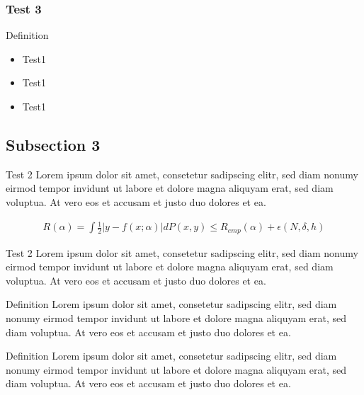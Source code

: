 \documentclass{beamer}
\begin{document}
        \begin{frame}
            \frametitle{Test 3}
            \begin{block}{Definition}
            \begin{itemize}
                \item Test1
                \item Test1
                \item Test1
            \end{itemize}
            \end{block}
        \end{frame}

   \subsection{Subsection 3}
   
        \begin{frame}{Test 2}
       	    Lorem ipsum dolor sit amet, consetetur sadipscing elitr, sed diam nonumy eirmod tempor invidunt ut labore et dolore magna aliquyam erat, sed diam voluptua. At vero eos et accusam et justo duo dolores et ea.

            \begin{align}
                R(\alpha) = \int \frac{1}{2} |y - f(x;\alpha)| dP(x,y) \leq R_{emp}(\alpha) + \epsilon(N, \delta, h)
            \end{align}   
        \end{frame}

   
        \begin{frame}{Test 2}
                Lorem ipsum dolor sit amet, consetetur sadipscing elitr, sed diam nonumy eirmod tempor invidunt ut labore et dolore magna aliquyam erat, sed diam voluptua. At vero eos et accusam et justo duo dolores et ea.
            \begin{block}{Definition}
                Lorem ipsum dolor sit amet, consetetur sadipscing elitr, sed diam nonumy eirmod tempor invidunt ut labore et dolore magna aliquyam erat, sed diam voluptua. At vero eos et accusam et justo duo dolores et ea.
            \end{block}
            \pause
            \begin{block}{Definition}
                Lorem ipsum dolor sit amet, consetetur sadipscing elitr, sed diam nonumy eirmod tempor invidunt ut labore et dolore magna aliquyam erat, sed diam voluptua. At vero eos et accusam et justo duo dolores et ea.
            \end{block}
        \end{frame}
\end{document}
